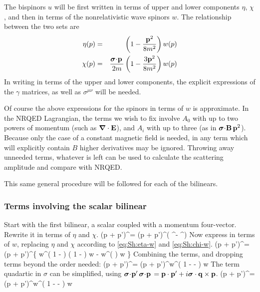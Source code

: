 The bispinors $u$ will be first written in terms of upper and lower components $\eta$, $\chi$, and then in terms of the nonrelativistic wave spinors $w$.  The relationship between the two sets are
\begin{eqnarray}
	\label{eq:Sh:eta-w} \eta(p) &=& \left( 1 - \frac{\mathbf{p}^2}{8m^2} \right ) w(p)	\\
	\label{eq:Sh:chi-w}  \chi(p)	&=& \frac{ \mbox{\boldmath$ \sigma $} \hspace{-2pt} \cdot \hspace{-2pt} \mathbf{p} \, }{2m} \left(1  - \frac{3\mathbf{p}^2}{8m^2} \right ) w(p)
\end{eqnarray}
In writing in terms of the upper and lower components,  the explicit expressions of the $\gamma$ matrices, as well as $\sigma^{\mu\nu}$ will be needed.  

Of course the above expressions for the spinors in terms of $w$ is approximate.  In the NRQED Lagrangian, the terms we wish to fix involve $A_0$ with up to two powers of momentum (such as $\mbox{\boldmath$ \nabla $} \cdot \mathbf{E}$), and $A_i$ with up to three (as in $\mbox{\boldmath$ \sigma $} \hspace{-2pt} \cdot \hspace{-2pt} \mathbf{B} \, \mathbf{p}^2$).  Because only the case of a constant magnetic field is needed, in any term which will explicitly contain $B$ higher derivatives may be ignored.  Throwing away unneeded terms, whatever is left can be used to calculate the scattering amplitude and compare with NRQED.

This same general procedure will be followed for each of the bilinears.

\subsubsection{Terms involving the scalar bilinear}
Start with the first bilinear, a scalar coupled with a momentum four-vector.  Rewrite it in terms of $\eta$ and $\chi$.
\beq
	(p + p')^\mu \srb \sr  = (p + p')^\mu \left( \eta^\dagger \eta - \chi^\dagger \chi \right ) 
\eeq
Now express in terms of $w$, replacing $\eta$ and $\chi$ according to \eqref{eq:Sh:eta-w} and \eqref{eq:Sh:chi-w}.
\beq
	(p + p')^\mu \srb \sr = (p + p')^\mu \left \{
		w^\dagger \left( 1 -  \right )  \left( 1 -  \right ) w
		- w^\dagger \left(   \right ) w \right \}
\eeq 
Combining the terms, and dropping terms beyond the order needed:
\beq
	(p + p')^\mu \srb \sr = (p + p')^\mu w^\dagger \left( 
		1 -   - \frac{ \gv{\sigma} \cdot \v{p'} \gv{\sigma} \cdot \v{p} }{4m^2} 
		\right ) w
\eeq
The term quadartic in $\sigma$ can be simplified, using $\mbox{\boldmath$ \sigma $} \hspace{-2pt} \cdot \hspace{-2pt} \mathbf{p'} \, \mbox{\boldmath$ \sigma $} \hspace{-2pt} \cdot \hspace{-2pt} \mathbf{p} \, = \mathbf{p} \cdot \mathbf{p'} + i\mbox{\boldmath$ \sigma $} \cdot \mathbf{q} \times \mathbf{p}$.
\beq \label{eq:Sh:Si}
	(p + p')^\mu \srb \sr  = (p + p')^\mu w^\dagger \left( 
		1 -   - \frac{i\gv{\sigma} \cdot \v{q} \times \v{p} }{4m^2} 
		\right ) w
\eeq

